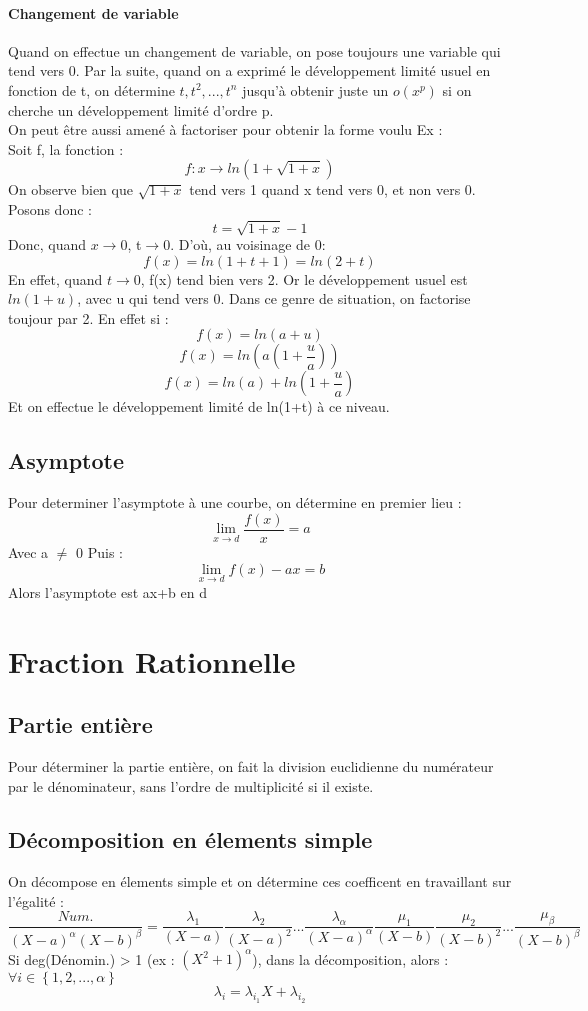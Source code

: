 \documentclass[a4paper,12 pt,oneside]{report}     %
\begin{document}
\subsubsection{Changement de variable}
Quand on effectue un changement de variable, on pose toujours une variable qui tend vers 0. Par la suite, quand on a exprimé le développement limité usuel en fonction de t, on détermine $t,t^2,...,t^n$ jusqu'à obtenir juste un $o(x^p)$ si on cherche un développement limité d'ordre p.\\
On peut être aussi amené à factoriser pour obtenir la forme voulu
Ex : \\
Soit f, la fonction : 
$$f : x \rightarrow ln(1+\sqrt{1+x})$$
On observe bien que $\sqrt{1+x}$ tend vers 1 quand x tend vers 0, et non vers 0. Posons donc :
$$t = \sqrt{1+x} - 1$$
Donc, quand $x\rightarrow 0$, t$\rightarrow 0$. D'où, au voisinage de 0:
$$f(x) = ln (1 + t + 1)=ln(2+t)$$
En effet, quand $t\rightarrow 0$, f(x) tend bien vers 2.
Or le développement usuel est $ln(1+u)$, avec u qui tend vers 0. Dans ce genre de situation, on factorise toujour par 2. En effet si :
$$f(x) = ln(a+u)$$
$$f(x) = ln(a(1+\dfrac{u}{a}))$$
$$f(x) = ln(a) + ln(1+\dfrac{u}{a})$$
Et on effectue le développement limité de ln(1+t) à ce niveau.
\section{Asymptote}
Pour determiner l'asymptote à une courbe, on détermine en premier lieu :
$$\lim_{x \rightarrow d} \dfrac{f(x)}{x} = a$$
Avec a $\neq$ 0
Puis : 
$$\lim_{x \rightarrow d} f(x)-ax = b$$
Alors l'asymptote est ax+b en d
\chapter{Fraction Rationnelle}
\section{Partie entière}
Pour déterminer la partie entière, on fait la division euclidienne du numérateur par le dénominateur, sans l'ordre de multiplicité si il existe.
\section{Décomposition en élements simple}
On décompose en élements simple et on détermine ces coefficent en travaillant sur l'égalité :
$$\dfrac{Num.}{(X-a)^{\alpha}(X-b)^{\beta}} = \dfrac{\lambda_1}{(X-a)} \dfrac{\lambda_2}{(X-a)^2}...\dfrac{\lambda_{\alpha}}{(X-a)^{\alpha}} \dfrac{\mu_1}{(X-b)} \dfrac{\mu_2}{(X-b)^2}...\dfrac{\mu_{\beta}}{(X-b)^{\beta}}$$
Si deg(Dénomin.) > 1 (ex : $(X^2+1)^{\alpha}$), dans la décomposition, alors :\
$\forall i \in \left\lbrace 1,2,...,\alpha \right\rbrace $
$$\lambda_i = \lambda_{i_1}X+\lambda_{i_2}$$
\end{document}
